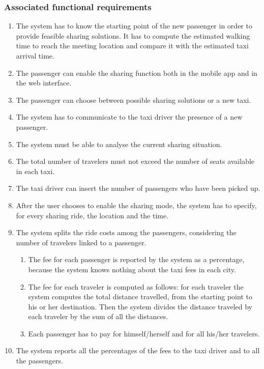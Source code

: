 \subsubsection{Associated functional requirements}
\begin{enumerate}
	\item The system has to know the starting point of the new passenger in order to provide feasible sharing solutions.
	It has to compute the estimated walking time to reach the meeting location and compare it with the estimated taxi arrival time.
	\item The passenger can enable the sharing function both in the mobile app and in the web interface.
	\item The passenger can choose between possible sharing solutions or a new taxi.
	\item The system has to communicate to the taxi driver the presence of a new passenger.
	\item The system must be able to analyse the current sharing situation. %
	\item The total number of travelers must not exceed the number of seats available in each taxi.
	\item The taxi driver can insert the number of passengers who have been picked up.
	\item After the user chooses to enable the sharing mode, the system has to specify, for every sharing ride, the location and the time.
	\item The system splits the ride costs among the passengers, considering the number of travelers linked to a passenger.
	\begin{enumerate}
		\item The fee for each passenger is reported by the system as a percentage, because the system knows nothing about the taxi fees in each city.
		\item The fee for each traveler is computed as follows: for each traveler the system computes the total distance travelled, from the starting point to his or her destination. Then the system divides the distance traveled by each traveler by the sum of all the distances.
		\item Each passenger has to pay for himself/herself and for all his/her travelers.
	\end{enumerate}
	\item The system reports all the percentages of the fees to the taxi driver and to all the passengers.
\end{enumerate}
